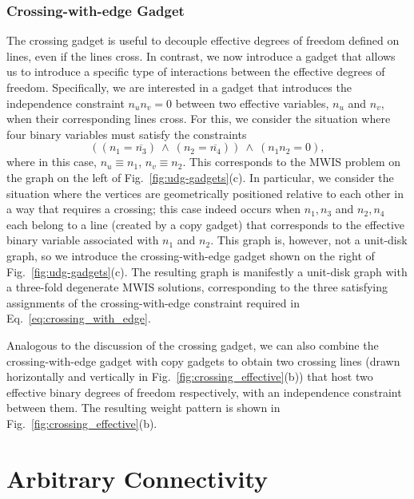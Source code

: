 \subsubsection{Crossing-with-edge Gadget}
The crossing gadget is useful to decouple effective degrees of freedom defined on lines, even if the lines cross. In contrast, we now introduce a gadget that allows us to introduce a specific type of interactions between the effective degrees of freedom. Specifically, we are interested in a gadget that introduces the independence constraint $n_u n_v = 0$ between two effective variables, $n_u$ and $n_v$, when their corresponding lines cross. For this, we consider the situation where four binary variables must satisfy the constraints
\begin{equation}
    ((n_1 = \overline{n_3}) \ \wedge \ (n_2 = \overline{n_4})) \ \wedge \ (n_1 n_2 = 0), \label{eq:crossing_with_edge}
\end{equation}
where in this case, $n_u\equiv n_1$, $n_v\equiv n_2$. This  corresponds to the MWIS problem on the graph on the left of Fig.~\ref{fig:udg-gadgets}(c). In particular, we consider the situation where the vertices are geometrically positioned relative to each other in a way that requires a crossing; this case indeed occurs when $n_1, n_3$ and $n_2, n_4$ each belong to a line (created by a copy gadget) that corresponds to the effective binary variable associated with $n_1$ and $n_2$. This graph is, however, not a unit-disk graph, so we introduce the crossing-with-edge gadget shown on the right of Fig.~\ref{fig:udg-gadgets}(c). The resulting graph is manifestly a unit-disk graph with a three-fold degenerate MWIS solutions, corresponding to the three satisfying assignments of the crossing-with-edge constraint required in Eq.~\eqref{eq:crossing_with_edge}.

Analogous to the discussion of the crossing gadget, we can also combine the crossing-with-edge gadget with copy gadgets to obtain two crossing lines (drawn horizontally and vertically in Fig.~\ref{fig:crossing_effective}(b)) that host two effective binary degrees of freedom respectively, with an independence constraint between them. The resulting weight pattern is shown in Fig.~\ref{fig:crossing_effective}(b).



\section{Arbitrary Connectivity}
\label{sec:arbitrary_Connectivity}

